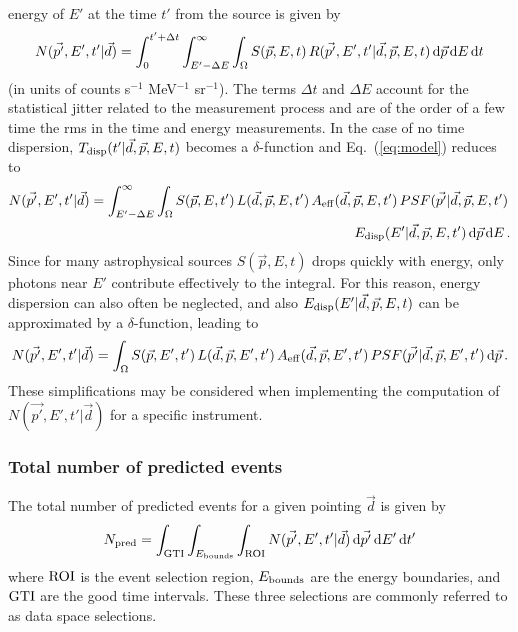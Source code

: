 \documentclass{article}[12pt,a4]
\begin{document}
energy of $E'$ at the time $t'$ from the source is given by
\begin{equation}
N(\vec{p'}, E', t'| \vec{d}) = \int_{0}^{t'+\Delta t} \int_{E'-\Delta E}^{\infty} \int_{\Omega} 
  S(\vec{p}, E, t) \, R(\vec{p'}, E', t' | \vec{d}, \vec{p}, E, t) \, {\rm d}\vec{p} \, {\rm d}E \,{\rm d}t
\label{eq:model}
\end{equation}
(in units of counts s$^{-1}$ MeV$^{-1}$ sr$^{-1}$).
The terms $\Delta t$ and $\Delta E$ account for the statistical jitter related to the measurement
process and are of the order of a few time the rms in the time and energy measurements.
In the case of no time dispersion, $T_{\rm disp}(t' | \vec{d}, \vec{p}, E, t)$ becomes a $\delta$-function
and Eq.~(\ref{eq:model}) reduces to 
\begin{eqnarray}
N(\vec{p'}, E', t' | \vec{d}) = \int_{E'-\Delta E}^{\infty} \int_{\Omega} 
  S(\vec{p}, E, t') \,
  L(\vec{d}, \vec{p}, E, t') \,
  A_{\rm eff}(\vec{d}, \vec{p}, E, t') \,
  PSF(\vec{p'} | \vec{d}, \vec{p}, E, t') \,  \nonumber \\
  E_{\rm disp}(E' | \vec{d}, \vec{p}, E, t') 
\, {\rm d}\vec{p} \, {\rm d}E \, .
\end{eqnarray}
Since for many astrophysical sources $S(\vec{p}, E, t)$ drops quickly with energy, only
photons near $E'$ contribute effectively to the integral.
For this reason, energy dispersion can also often be neglected, and also
$E_{\rm disp}(E' | \vec{d}, \vec{p}, E, t)$ can be approximated by a $\delta$-function,
leading to
\begin{equation}
N(\vec{p'}, E', t'| \vec{d}) = \int_{\Omega} 
  S(\vec{p}, E', t') \,
  L(\vec{d}, \vec{p}, E', t') \,
  A_{\rm eff}(\vec{d}, \vec{p}, E', t') \,
  PSF(\vec{p'} | \vec{d}, \vec{p}, E', t') \, {\rm d}\vec{p} \, .
\end{equation}
These simplifications may be considered when implementing the computation of
$N(\vec{p'}, E', t' | \vec{d})$ for a specific instrument.


\subsubsection{Total number of predicted events}

The total number of predicted events for a given pointing $\vec{d}$ is given by
\begin{equation}
N_{\rm pred} = \int_{\rm GTI} \int_{E_{\rm bounds}} \int_{\rm ROI} 
N(\vec{p'}, E', t' | \vec{d}) \, {\rm d}\vec{p'} \, {\rm d}E' \,{\rm d}t'
\end{equation}
where
${\rm ROI}$ is the event selection region,
$E_{\rm bounds}$ are the energy boundaries, and
${\rm GTI}$ are the good time intervals.
These three selections are commonly referred to as data space selections.
\end{document}
